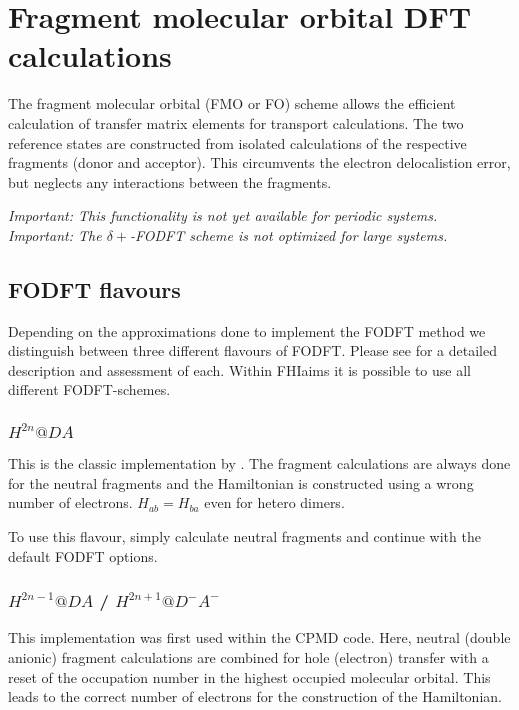 \section{Fragment molecular orbital DFT calculations}

The fragment molecular orbital (FMO or FO) scheme allows the efficient calculation of transfer matrix
elements for transport calculations. The two reference states are constructed from isolated calculations
of the respective fragments (donor and acceptor). This circumvents the electron delocalistion error, but neglects any interactions between the fragments. 

\emph{Important: This functionality is not yet available for periodic systems.}\\
\emph{Important: The $\delta+$-FODFT scheme is not optimized for large systems.}

\subsection*{FODFT flavours}
Depending on the approximations done to implement the FODFT method we distinguish between three different flavours of FODFT. Please see \cite{Schober2015} for a detailed description and assessment of each. Within FHIaims it is possible to use all different FODFT-schemes. 

\subsubsection*{$H^{2n}@DA$}
This is the classic implementation by \cite{Senthilkumar2003}. The fragment calculations are always done for the neutral fragments and the Hamiltonian is constructed using a wrong number of electrons. $H_{ab} = H_{ba}$ even for hetero dimers. 

To use this flavour, simply calculate neutral fragments and continue with the default FODFT options.

\subsubsection*{$H^{2n-1}@DA$ / $H^{2n+1}@D^-A^-$}
This implementation was first used within the CPMD code\cite{Oberhofer2012}. Here, neutral (double anionic) fragment calculations are combined for hole (electron) transfer with a reset of the occupation number in the highest occupied molecular orbital. This leads to the correct number of electrons for the construction of the Hamiltonian.


